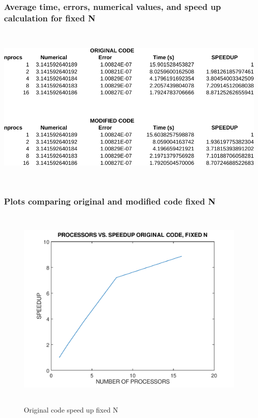 \documentclass[12pt]{article}
\begin{document}
	\newpage
	\subsubsection{Average time, errors, numerical values, and speed up calculation for fixed N}
	\begin{center}	
		\includegraphics[width = 150mm,height = 80mm]{fixedN_final-crop}
	\end{center}
	
	\subsubsection{Plots comparing original and modified code fixed N}

	\begin{figure}[H]
		\hfill\includegraphics[width=150mm,height= 100mm]{fix_ori.png}\hspace*{\fill}
		\caption{Original code speed up fixed N}
	\end{figure}
\end{document}
